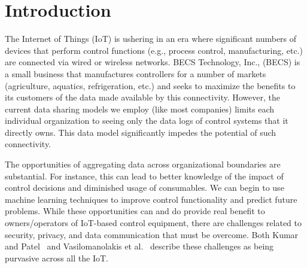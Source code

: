 \section{Introduction}
\label{sec:intro}

%


The Internet of Things (IoT) is ushering in an era where significant numbers of devices that perform control functions (e.g., process control,
manufacturing, etc.) are connected via wired or wireless networks.
BECS Technology, Inc., (BECS) is a small business that manufactures controllers for a number of markets (agriculture, aquatics, refrigeration, etc.) and seeks to maximize the benefits to its customers of the data made available by this connectivity.
However, the current data sharing models we employ (like most companies) limits each individual organization to seeing only the data logs of control systems that it directly owns. 
This data model significantly impedes the potential of such connectivity.

The opportunities of aggregating data across organizational boundaries are substantial.
For instance, this can lead to better knowledge of the impact of control decisions and diminished usage of consumables.
We can begin to use machine learning techniques to improve control functionality and predict future problems. 
While these opportunities can and do provide real benefit to owners/operators of IoT-based control equipment, there are challenges related to security, privacy, and data communication that must be overcome.
Both Kumar and Patel~\cite{kp14} and
Vasilomanolakis et al.~\cite{vdlgw15} describe these challenges as being
purvasive across all the IoT.

